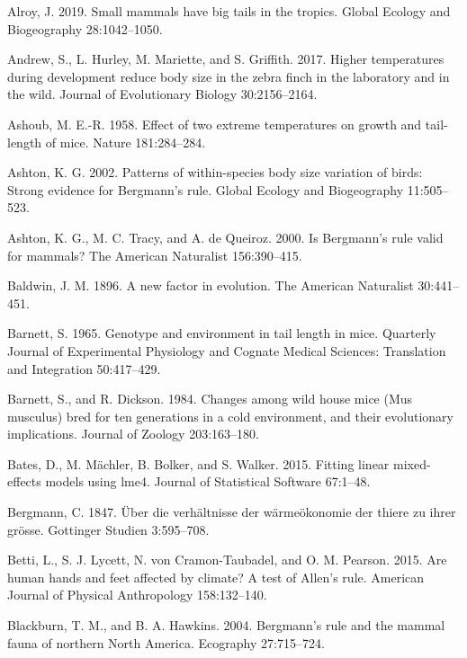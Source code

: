 \documentclass[]{article}
\begin{document}
\leavevmode\hypertarget{ref-Alroy2019}{}%
Alroy, J. 2019. Small mammals have big tails in the tropics. Global
Ecology and Biogeography 28:1042--1050.

\leavevmode\hypertarget{ref-Andrew2017}{}%
Andrew, S., L. Hurley, M. Mariette, and S. Griffith. 2017. Higher
temperatures during development reduce body size in the zebra finch in
the laboratory and in the wild. Journal of Evolutionary Biology
30:2156--2164.

\leavevmode\hypertarget{ref-Ashoub1958}{}%
Ashoub, M. E.-R. 1958. Effect of two extreme temperatures on growth and
tail-length of mice. Nature 181:284--284.

\leavevmode\hypertarget{ref-Ashton2002}{}%
Ashton, K. G. 2002. Patterns of within-species body size variation of
birds: Strong evidence for Bergmann's rule. Global Ecology and
Biogeography 11:505--523.

\leavevmode\hypertarget{ref-Ashton2000}{}%
Ashton, K. G., M. C. Tracy, and A. de Queiroz. 2000. Is Bergmann's rule
valid for mammals? The American Naturalist 156:390--415.

\leavevmode\hypertarget{ref-Baldwin1896}{}%
Baldwin, J. M. 1896. A new factor in evolution. The American Naturalist
30:441--451.

\leavevmode\hypertarget{ref-Barnett1965}{}%
Barnett, S. 1965. Genotype and environment in tail length in mice.
Quarterly Journal of Experimental Physiology and Cognate Medical
Sciences: Translation and Integration 50:417--429.

\leavevmode\hypertarget{ref-Barnett1984}{}%
Barnett, S., and R. Dickson. 1984. Changes among wild house mice (Mus
musculus) bred for ten generations in a cold environment, and their
evolutionary implications. Journal of Zoology 203:163--180.

\leavevmode\hypertarget{ref-Bates2015}{}%
Bates, D., M. Mächler, B. Bolker, and S. Walker. 2015. Fitting linear
mixed-effects models using lme4. Journal of Statistical Software
67:1--48.

\leavevmode\hypertarget{ref-Bergmann1847}{}%
Bergmann, C. 1847. Über die verhältnisse der wärmeökonomie der thiere zu
ihrer grösse. Gottinger Studien 3:595--708.

\leavevmode\hypertarget{ref-Betti2015}{}%
Betti, L., S. J. Lycett, N. von Cramon-Taubadel, and O. M. Pearson.
2015. Are human hands and feet affected by climate? A test of Allen's
rule. American Journal of Physical Anthropology 158:132--140.

\leavevmode\hypertarget{ref-Blackburn2004}{}%
Blackburn, T. M., and B. A. Hawkins. 2004. Bergmann's rule and the
mammal fauna of northern North America. Ecography 27:715--724.
\end{document}
